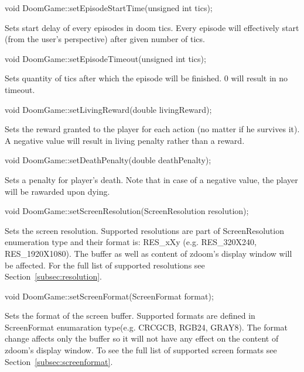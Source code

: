 \vspace{20pt}
\begin{clinee}    
void DoomGame::setEpisodeStartTime(unsigned int tics);
\end{clinee}

Sets start delay of every episodes in doom tics. Every episode will effectively start (from the user's perspective) after given number of tics.


\vspace{20pt}
\begin{clinee}
void DoomGame::setEpisodeTimeout(unsigned int tics);
\end{clinee}

Sets quantity of tics after which the episode will be finished. 0 will result in no timeout.


\vspace{20pt}
\begin{clinee}
void DoomGame::setLivingReward(double livingReward);
\end{clinee}

Sets the reward granted to the player for each action (no matter if he survives it). A negative value will result in living penalty rather than a reward.


\vspace{20pt}
\begin{clinee}
void DoomGame::setDeathPenalty(double deathPenalty);
\end{clinee}
	Sets a penalty for player's death. Note that in case of a negative value, the player will be rawarded upon dying.

\vspace{20pt}
\begin{clinee}
void DoomGame::setScreenResolution(ScreenResolution resolution);
\end{clinee}
	Sets the screen resolution. Supported resolutions are part of ScreenResolution enumeration type and their format is: RES\_xXy (e.g. RES\_320X240, RES\_1920X1080). The buffer as well as content of zdoom's display window will be affected. For the full list of supported resolutions see Section~\ref{subsec:resolution}.

\vspace{20pt}
\begin{clinee}
void DoomGame::setScreenFormat(ScreenFormat format);
\end{clinee}
	Sets the format of the screen buffer. Supported formats are defined in ScreenFormat enumaration type(e.g. CRCGCB, RGB24, GRAY8). The format change affects only the buffer so it will not have any effect on the content of zdoom's display window. To see the full list of supported screen formats see Section~\ref{subsec:screenformat}.


